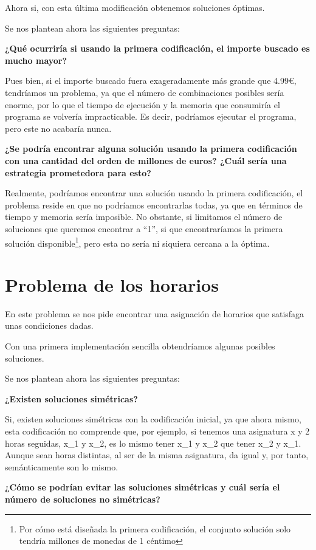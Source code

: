 Ahora si, con esta última modificación obtenemos soluciones óptimas.

Se nos plantean ahora las siguientes preguntas:

\textbf{¿Qué ocurriría si usando la primera codificación, el importe buscado es mucho mayor?}

Pues bien, si el importe buscado fuera exageradamente más grande que 4.99€, tendríamos un problema, ya que el número de combinaciones posibles sería enorme, por lo que el tiempo de ejecución y la memoria que consumiría el programa se volvería impracticable. Es decir, podríamos ejecutar el programa, pero este no acabaría nunca.

\textbf{¿Se podría encontrar alguna solución usando la primera codificación con una cantidad del orden de millones de euros? ¿Cuál sería una estrategia prometedora para esto?}

Realmente, podríamos encontrar una solución usando la primera codificación, el problema reside en que no podríamos encontrarlas todas, ya que en términos de tiempo y memoria sería imposible. No obstante, si limitamos el número de soluciones que queremos encontrar a ``1'', si que encontraríamos la primera solución disponible\footnote{Por cómo está diseñada la primera codificación, el conjunto solución solo tendría millones de monedas de 1 céntimo}, pero esta no sería ni siquiera cercana a la óptima.

\newpage

\section{Problema de los horarios}

En este problema se nos pide encontrar una asignación de horarios que satisfaga unas condiciones dadas.

Con una primera implementación sencilla obtendríamos algunas posibles soluciones.


Se nos plantean ahora las siguientes preguntas:

\textbf{¿Existen soluciones simétricas?}

Si, existen soluciones simétricas con la codificación inicial, ya que ahora mismo, esta codificación no comprende que, por ejemplo, si tenemos una asignatura x y 2 horas seguidas, x\_1 y x\_2, es lo mismo tener x\_1 y x\_2 que tener x\_2 y x\_1. Aunque sean horas distintas, al ser de la misma asignatura, da igual y, por tanto, semánticamente son lo mismo.

\textbf{¿Cómo se podrían evitar las soluciones simétricas y cuál sería el número de soluciones no simétricas?}

